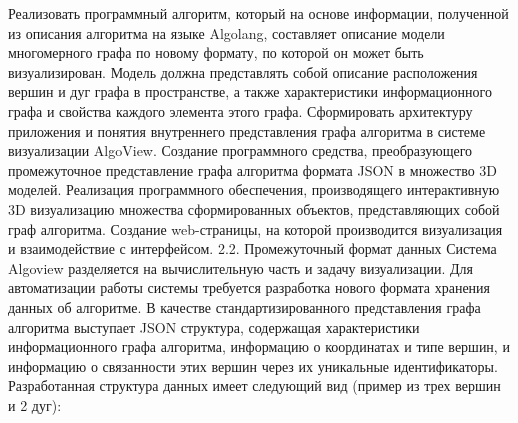Реализовать программный алгоритм, который на основе информации, полученной из описания алгоритма на языке Algolang, составляет описание модели многомерного графа по новому формату, по которой он может быть визуализирован. Модель должна представлять собой описание расположения вершин и дуг графа в пространстве, а также характеристики информационного графа и свойства каждого элемента этого графа.
Сформировать архитектуру приложения и понятия внутреннего представления графа алгоритма в системе визуализации AlgoView.
Создание программного средства, преобразующего промежуточное представление графа алгоритма формата JSON в множество 3D моделей.
Реализация программного обеспечения, производящего интерактивную 3D визуализацию множества сформированных объектов, представляющих собой граф алгоритма.
Создание web-страницы, на которой производится визуализация и взаимодействие с интерфейсом.
2.2. Промежуточный формат данных
Система Algoview разделяется на вычислительную часть и задачу визуализации. Для автоматизации работы системы требуется разработка нового формата хранения данных об алгоритме. В качестве стандартизированного представления графа алгоритма выступает JSON структура, содержащая характеристики информационного графа алгоритма, информацию о координатах и типе вершин, и информацию о связанности этих вершин через их уникальные идентификаторы. Разработанная структура данных имеет следующий вид (пример из трех вершин и 2 дуг):

